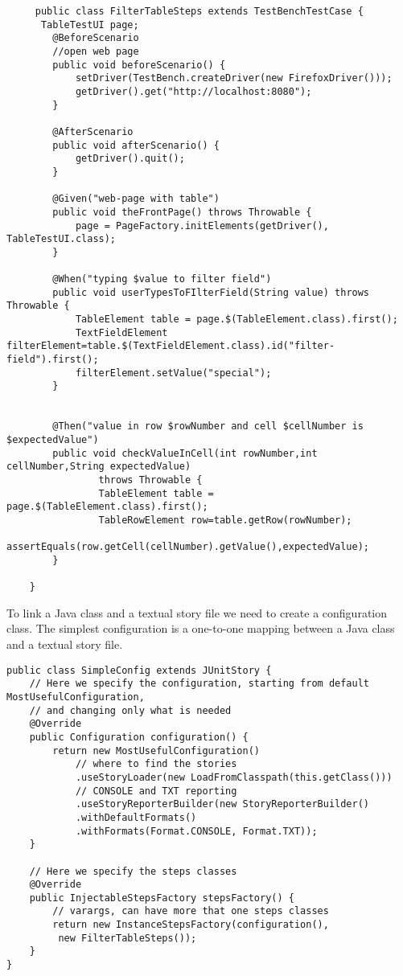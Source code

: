   	\lstset{language=Java}
  	\begin{lstlisting}
	 public class FilterTableSteps extends TestBenchTestCase {
	  TableTestUI page;
	    @BeforeScenario
	    //open web page
	    public void beforeScenario() {
	        setDriver(TestBench.createDriver(new FirefoxDriver()));
	        getDriver().get("http://localhost:8080");
	    }
	
	    @AfterScenario
	    public void afterScenario() {
	        getDriver().quit();
	    }
	
	    @Given("web-page with table")
	    public void theFrontPage() throws Throwable {
	        page = PageFactory.initElements(getDriver(), TableTestUI.class);
	    }
	
	    @When("typing $value to filter field")
	    public void userTypesToFIlterField(String value) throws Throwable {
	        TableElement table = page.$(TableElement.class).first();
			TextFieldElement filterElement=table.$(TextFieldElement.class).id("filter-field").first();
			filterElement.setValue("special");
	    }
	
	
	    @Then("value in row $rowNumber and cell $cellNumber is $expectedValue")
	    public void checkValueInCell(int rowNumber,int cellNumber,String expectedValue)
	            throws Throwable {
	            TableElement table = page.$(TableElement.class).first();
				TableRowElement row=table.getRow(rowNumber);
				assertEquals(row.getCell(cellNumber).getValue(),expectedValue);
	    }
	
	}
\end{lstlisting}
To link a Java class and a textual story file we need to create a configuration class.
The simplest configuration is a one-to-one mapping between a Java class and a textual story file. 

\lstset{language=Java}
\begin{lstlisting}
public class SimpleConfig extends JUnitStory {
    // Here we specify the configuration, starting from default MostUsefulConfiguration,
    // and changing only what is needed
    @Override
    public Configuration configuration() {
    	return new MostUsefulConfiguration()
        	// where to find the stories
            .useStoryLoader(new LoadFromClasspath(this.getClass())) 
            // CONSOLE and TXT reporting
            .useStoryReporterBuilder(new StoryReporterBuilder()
            .withDefaultFormats()
            .withFormats(Format.CONSOLE, Format.TXT));
    }
 
    // Here we specify the steps classes
    @Override
    public InjectableStepsFactory stepsFactory() {    	
        // varargs, can have more that one steps classes
        return new InstanceStepsFactory(configuration(),
         new FilterTableSteps());
    }
}
\end{lstlisting}

